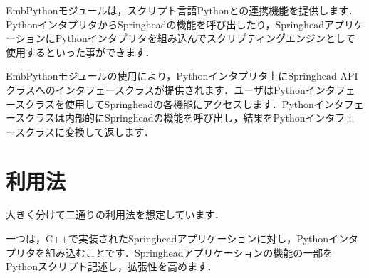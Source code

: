 \KLUDGE %
\KLUDGE %
\KLUDGE %

\KLUDGE %
\KLUDGE %
\KLUDGE %

\KLUDGE %

\KLUDGE %
\KLUDGE %
\KLUDGE %

\KLUDGE %
\KLUDGE %


\KLUDGE %
\KLUDGE %
\KLUDGE %
\KLUDGE %
\begin{chapterabstract}
EmbPythonモジュールは，スクリプト言語Pythonとの連携機能を提供します．PythonインタプリタからSpringheadの機能を呼び出したり，SpringheadアプリケーションにPythonインタプリタを組み込んでスクリプティングエンジンとして使用するといった事ができます．

EmbPythonモジュールの使用により，Pythonインタプリタ上にSpringhead APIクラスへのインタフェースクラスが提供されます．ユーザはPythonインタフェースクラスを使用してSpringheadの各機能にアクセスします．Pythonインタフェースクラスは内部的にSpringheadの機能を呼び出し，結果をPythonインタフェースクラスに変換して返します．
\end{chapterabstract}

\KLUDGE %
\KLUDGE %
\KLUDGE %
\KLUDGE %
\section{利用法}

\KLUDGE 大きく分けて二通りの利用法を想定しています．

\KLUDGE 一つは，C++で実装されたSpringheadアプリケーションに対し，Pythonインタプリタを組み込むことです．Springheadアプリケーションの機能の一部をPythonスクリプト記述し，拡張性を高めます．

